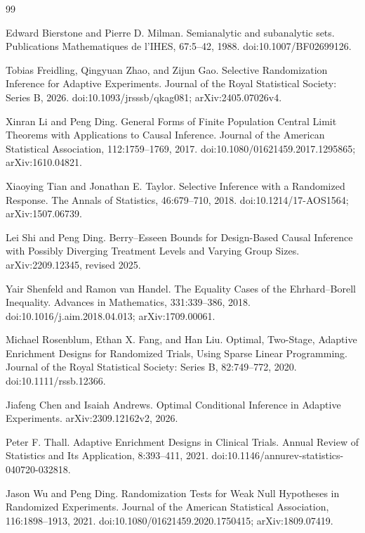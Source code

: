 \documentclass{article}
\begin{document}
\begin{thebibliography}{99}

   Edward Bierstone and Pierre D. Milman. Semianalytic and subanalytic sets. Publications Mathematiques de l'IHES, 67:5--42, 1988. doi:10.1007/BF02699126.

   Tobias Freidling, Qingyuan Zhao, and Zijun Gao. Selective Randomization Inference for Adaptive Experiments. Journal of the Royal Statistical Society: Series B, 2026. doi:10.1093/jrsssb/qkag081; arXiv:2405.07026v4.

   Xinran Li and Peng Ding. General Forms of Finite Population Central Limit Theorems with Applications to Causal Inference. Journal of the American Statistical Association, 112:1759--1769, 2017. doi:10.1080/01621459.2017.1295865; arXiv:1610.04821.

   Xiaoying Tian and Jonathan E. Taylor. Selective Inference with a Randomized Response. The Annals of Statistics, 46:679--710, 2018. doi:10.1214/17-AOS1564; arXiv:1507.06739.

   Lei Shi and Peng Ding. Berry--Esseen Bounds for Design-Based Causal Inference with Possibly Diverging Treatment Levels and Varying Group Sizes. arXiv:2209.12345, revised 2025.

   Yair Shenfeld and Ramon van Handel. The Equality Cases of the Ehrhard--Borell Inequality. Advances in Mathematics, 331:339--386, 2018. doi:10.1016/j.aim.2018.04.013; arXiv:1709.00061.

   Michael Rosenblum, Ethan X. Fang, and Han Liu. Optimal, Two-Stage, Adaptive Enrichment Designs for Randomized Trials, Using Sparse Linear Programming. Journal of the Royal Statistical Society: Series B, 82:749--772, 2020. doi:10.1111/rssb.12366.

   Jiafeng Chen and Isaiah Andrews. Optimal Conditional Inference in Adaptive Experiments. arXiv:2309.12162v2, 2026.

   Peter F. Thall. Adaptive Enrichment Designs in Clinical Trials. Annual Review of Statistics and Its Application, 8:393--411, 2021. doi:10.1146/annurev-statistics-040720-032818.

   Jason Wu and Peng Ding. Randomization Tests for Weak Null Hypotheses in Randomized Experiments. Journal of the American Statistical Association, 116:1898--1913, 2021. doi:10.1080/01621459.2020.1750415; arXiv:1809.07419.


\end{thebibliography}
\end{document}
